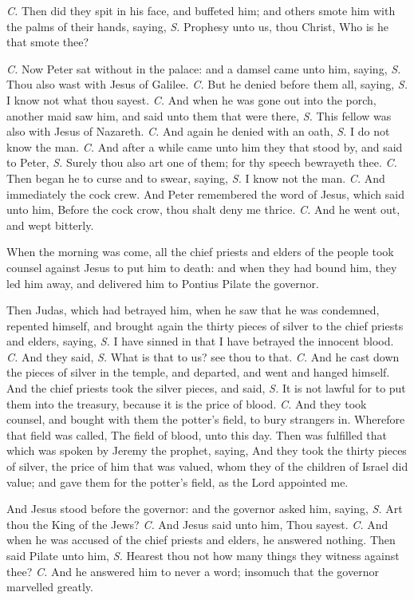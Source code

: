 \textit{C.} Then did they spit in his face, and buffeted him; and others smote him with the palms of their hands, saying, \textit{S.} Prophesy unto us, thou Christ, Who is he that smote thee?

\textit{C.} Now Peter sat without in the palace: and a damsel came unto him, saying, \textit{S.} Thou also wast with Jesus of Galilee. \textit{C.} But he denied before them all, saying, \textit{S.} I know not what thou sayest. \textit{C.} And when he was gone out into the porch, another maid saw him, and said unto them that were there, \textit{S.} This fellow was also with Jesus of Nazareth. \textit{C.} And again he denied with an oath, \textit{S.} I do not know the man. \textit{C.} And after a while came unto him they that stood by, and said to Peter, \textit{S.} Surely thou also art one of them; for thy speech bewrayeth thee. \textit{C.} Then began he to curse and to swear, saying, \textit{S.} I know not the man. \textit{C.} And immediately the cock crew. And Peter remembered the word of Jesus, which said unto him, {} Before the cock crow, thou shalt deny me thrice. \textit{C.} And he went out, and wept bitterly.

When the morning was come, all the chief priests and elders of the people took counsel against Jesus to put him to death: and when they had bound him, they led him away, and delivered him to Pontius Pilate the governor.

Then Judas, which had betrayed him, when he saw that he was condemned, repented himself, and brought again the thirty pieces of silver to the chief priests and elders, saying, \textit{S.} I have sinned in that I have betrayed the innocent blood. \textit{C.} And they said, \textit{S.} What is that to us? see thou to that. \textit{C.} And he cast down the pieces of silver in the temple, and departed, and went and hanged himself. And the chief priests took the silver pieces, and said, \textit{S.} It is not lawful for to put them into the treasury, because it is the price of blood. \textit{C.} And they took counsel, and bought with them the potter's field, to bury strangers in. Wherefore that field was called, The field of blood, unto this day. Then was fulfilled that which was spoken by Jeremy the prophet, saying, And they took the thirty pieces of silver, the price of him that was valued, whom they of the children of Israel did value; and gave them for the potter's field, as the Lord appointed me.

And Jesus stood before the governor: and the governor asked him, saying, \textit{S.} Art thou the King of the Jews? \textit{C.} And Jesus said unto him, {} Thou sayest. \textit{C.} And when he was accused of the chief priests and elders, he answered nothing. Then said Pilate unto him, \textit{S.} Hearest thou not how many things they witness against thee? \textit{C.} And he answered him to never a word; insomuch that the governor marvelled greatly.

